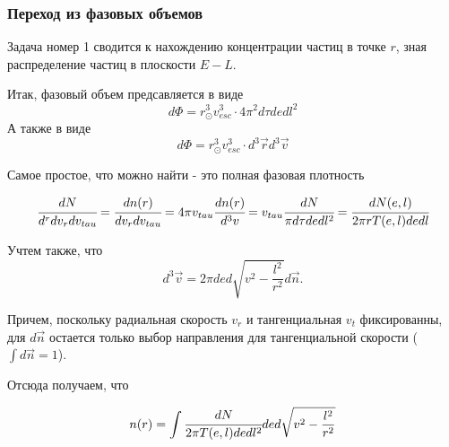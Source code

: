 \documentclass[a4paper, 14pt]{article}
\begin{document}
	
	\subsubsection{Переход из фазовых объемов}
	Задача номер 1 сводится к нахождению концентрации частиц в точке $r$, зная распределение частиц в плоскости $E-L$.
	
	Итак, фазовый объем предсавляется в виде
	\begin{equation}
		\label{eq:phase_volume_nd}
		d\Phi = r_{\odot}^3v_{esc}^3 \cdot 4\pi^{2} d\tau de dl^2
	\end{equation}
	А также в виде
	\begin{equation}
		d\Phi = r_{\odot}^3v_{esc}^3 \cdot d^3\vec{r}d^3\vec{v}
	\end{equation}
	
	Самое простое, что можно найти - это полная фазовая плотность
	
	\begin{equation*}
		\cfrac{dN}{d^r dv_r dv_{tau}} = 
		\cfrac{dn(r)}{dv_r dv_{tau}} = 
		4\pi v_{tau}\cfrac{dn(r)}{d^3v} = 
		v_{tau}\cfrac{dN}{\pi d\tau de dl^2} = 
		\cfrac{dN(e,l)}{2\pi r T(e,l) de dl}
	\end{equation*}
	
	Учтем также, что
	\begin{equation}
		\label{eq:velocity_dens}
		d^{3}\vec{v}  = 2\pi ded\sqrt{v^2-\frac{l^2}{r^2}} d\vec{n}.
	\end{equation}
	 
	 Причем, поскольку радиальная скорость $v_r$ и тангенциальная $v_{t}$ фиксированны, для $d\vec{n}$ остается только выбор направления для тангенциальной скорости ($\int{d\vec{n}} = 1$).
	 
	 Отсюда получаем, что
	 
	 \begin{equation}
	 	n(r) = \int{ \cfrac{dN}{2\pi T(e,l) de dl^2} de d\sqrt{v^2-\frac{l^2}{r^2}}}
	 \end{equation}
	 
\end{document}
